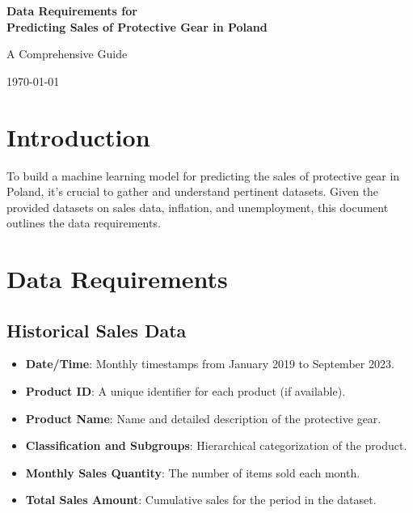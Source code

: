 \documentclass{article}
\begin{document}
\begin{titlepage}
    \centering
    \vspace*{4cm}
    {\Huge\bfseries Data Requirements for \\ Predicting Sales of Protective Gear in Poland \par}
    \vspace{2cm}
    {\large A Comprehensive Guide \par}
    \vfill
    \vspace{2cm}
    {\large \today\par}
\end{titlepage}

\newpage
\tableofcontents
\newpage    

\section{Introduction}
To build a machine learning model for predicting the sales of protective gear in Poland, it's crucial to gather and understand pertinent datasets. Given the provided datasets on sales data, inflation, and unemployment, this document outlines the data requirements.

\section{Data Requirements}

\subsection{Historical Sales Data}

\begin{itemize}
    \item \textbf{Date/Time}: Monthly timestamps from January 2019 to September 2023.
    \item \textbf{Product ID}: A unique identifier for each product (if available).
    \item \textbf{Product Name}: Name and detailed description of the protective gear.
    \item \textbf{Classification and Subgroups}: Hierarchical categorization of the product.
    \item \textbf{Monthly Sales Quantity}: The number of items sold each month.
    \item \textbf{Total Sales Amount}: Cumulative sales for the period in the dataset.
\end{itemize}
\end{document}
